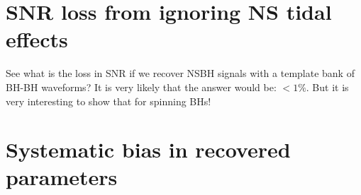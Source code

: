\documentclass[aps,prd,amsmath,floats,floatfix, twocolumn,
superscriptaddress,nofootinbib,showpacs]{revtex4-1}
\begin{document}
\section{SNR loss from ignoring NS tidal effects}
See what is the loss in SNR if we recover NSBH signals with a template bank of
BH-BH waveforms? It is very likely that the answer would be: $<1\%$. But it
is very interesting to show that for spinning BHs!

\section{Systematic bias in recovered parameters}
\end{document}
